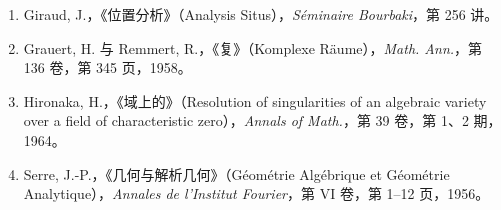 \begin{enumerate}
\item[{[1]}] Giraud, J.，《位置分析》（Analysis Situs），\textit{Séminaire Bourbaki}，第 256 讲。
\item[{[2]}] Grauert, H. 与 Remmert, R.，《复》（Komplexe Räume），\textit{Math. Ann.}，第 136 卷，第 345 页，1958。
\item[{[3]}] Hironaka, H.，《域上的》（Resolution of singularities of an algebraic variety over a field of characteristic zero），\textit{Annals of Math.}，第 39 卷，第 1、2 期，1964。
\item[{[4]}] Serre, J.-P.，《几何与解析几何》（Géométrie Algébrique et Géométrie Analytique），\textit{Annales de l'Institut Fourier}，第 VI 卷，第 1--12 页，1956。
\end{enumerate}
